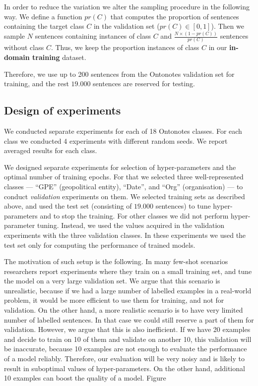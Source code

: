 In order to reduce the variation we alter the sampling procedure in the following way. We define a function $pr(C)$ that computes the proportion of sentences containing the target class $C$ in the validation set ($pr(C) \in [0, 1]$). Then we sample $N$ sentences containing instances of class $C$ and $\frac{N \times (1-pr(C))}{pr(C)}$ sentences without class $C$. Thus, we keep the proportion instances of class $C$ in our \textbf{in-domain training} dataset.

Therefore, we use up to 200 sentences from the Ontonotes validation set for training, and the rest $19.000$ sentences are reserved for testing. 

\subsection{Design of experiments}


We conducted separate experiments for each of 18 Ontonotes classes. For each class we conducted 4 experiments with different random seeds. We report averaged results for each class.

We designed separate experiments for selection of hyper-parameters and the optimal number of training epochs. For that we selected three well-represented classes --- ``GPE'' (geopolitical entity), ``Date'', and ``Org'' (organisation) --- to conduct \textit{validation} experiments on them. We selected training sets as described above, and used the test set (consisting of $19.000$ sentences) to tune hyper-parameters and to stop the training. For other classes we did not perform hyper-parameter tuning. Instead, we used the values acquired in the validation experiments with the three validation classes. In these experiments we used the test set only for computing the performance of trained models.

The motivation of such setup is the following. In many few-shot scenarios researchers report experiments where they train on a small training set, and tune the model on a very large validation set. We argue that this scenario is unrealistic, because if we had a large number of labelled examples in a real-world problem, it would be more efficient to use them for training, and not for validation. On the other hand, a more realistic scenario is to have very limited number of labelled sentences. In that case we could still reserve a part of them for validation. However, we argue that this is also inefficient. If we have 20 examples and decide to train on 10 of them and validate on another 10, this validation will be inaccurate, because 10 examples are not enough to evaluate the performance of a model reliably. Therefore, our evaluation will be very noisy and is likely to result in suboptimal values of hyper-parameters. On the other hand, additional 10 examples can boost the quality of a model. Figure 

